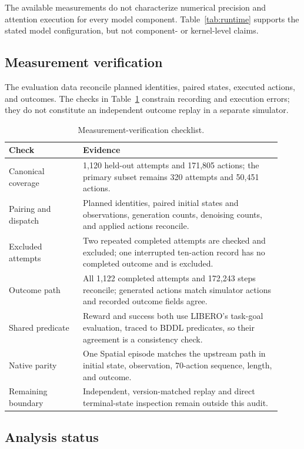 \documentclass{article}
\begin{document}
The available measurements do not characterize numerical precision and
attention execution for every model component. Table~\ref{tab:runtime} supports
the stated model configuration, but not component- or kernel-level claims.

{\small
\subsection{Measurement verification}
\label{app:verification}

The evaluation data reconcile planned identities, paired states, executed
actions, and outcomes. The checks
in Table~\ref{tab:verification-summary} constrain recording and execution
errors; they do not constitute an
independent outcome replay in a separate simulator.

\begin{table}[H]
\centering\small
\caption{Measurement-verification checklist.}
\label{tab:verification-summary}
\begin{tabular}{@{}p{0.25\linewidth}p{0.67\linewidth}@{}}
\toprule
Check & Evidence\\
\midrule
Canonical coverage & 1,120 held-out attempts and 171,805 actions; the
primary subset remains 320 attempts and 50,451 actions.\\
Pairing and dispatch & Planned identities, paired initial states and
observations, generation counts, denoising counts, and applied actions reconcile.\\
Excluded attempts & Two repeated completed attempts are checked and excluded;
one interrupted ten-action record has no completed outcome and is excluded.\\
Outcome path & All 1,122 completed attempts and 172,243 steps reconcile;
generated actions match simulator actions and recorded outcome fields agree.\\
Shared predicate & Reward and success both use LIBERO's task-goal evaluation,
traced to BDDL predicates, so their agreement is a consistency check.\\
Native parity & One Spatial episode matches the upstream path in initial state,
observation, 70-action sequence, length, and outcome.\\
Remaining boundary & Independent, version-matched replay and direct terminal-state
inspection remain outside this audit.\\
\bottomrule
\end{tabular}
\end{table}
\FloatBarrier
\subsection{Analysis status}
\label{app:analysis-status}

}
\end{document}
